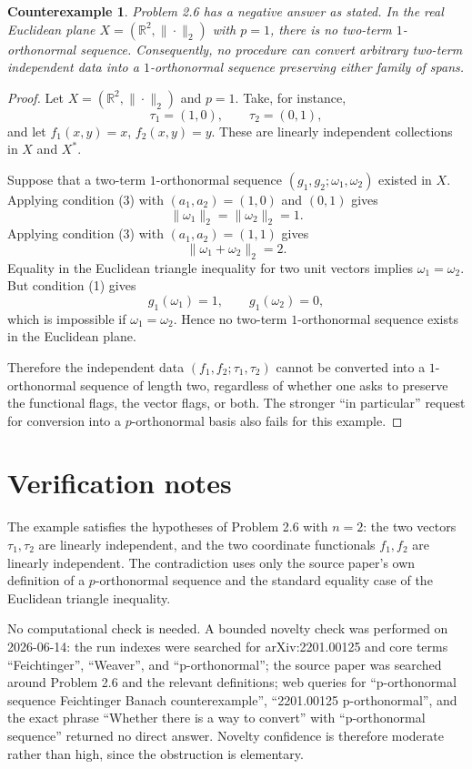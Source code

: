 \documentclass[11pt]{article}
\newtheorem*{theorem}{Counterexample}
\begin{document}
\begin{theorem}
Problem 2.6 has a negative answer as stated.  In the real Euclidean plane
$X=(\mathbb R^2,\|\cdot\|_2)$ with $p=1$, there is no two-term
$1$-orthonormal sequence.  Consequently, no procedure can convert arbitrary
two-term independent data into a $1$-orthonormal sequence preserving either
family of spans.
\end{theorem}

\begin{proof}
Let $X=(\mathbb R^2,\|\cdot\|_2)$ and $p=1$.  Take, for instance,
\[
  \tau_1=(1,0),\qquad \tau_2=(0,1),
\]
and let $f_1(x,y)=x$, $f_2(x,y)=y$.  These are linearly independent
collections in $X$ and $X^*$.

Suppose that a two-term $1$-orthonormal sequence
$(g_1,g_2;\omega_1,\omega_2)$ existed in $X$.  Applying condition (3) with
$(a_1,a_2)=(1,0)$ and $(0,1)$ gives
\[
  \|\omega_1\|_2=\|\omega_2\|_2=1.
\]
Applying condition (3) with $(a_1,a_2)=(1,1)$ gives
\[
  \|\omega_1+\omega_2\|_2=2.
\]
Equality in the Euclidean triangle inequality for two unit vectors implies
$\omega_1=\omega_2$.  But condition (1) gives
\[
  g_1(\omega_1)=1,\qquad g_1(\omega_2)=0,
\]
which is impossible if $\omega_1=\omega_2$.  Hence no two-term
$1$-orthonormal sequence exists in the Euclidean plane.

Therefore the independent data $(f_1,f_2;\tau_1,\tau_2)$ cannot be converted
into a $1$-orthonormal sequence of length two, regardless of whether one asks
to preserve the functional flags, the vector flags, or both.  The stronger
``in particular'' request for conversion into a $p$-orthonormal basis also
fails for this example.
\end{proof}

\section*{Verification notes}

The example satisfies the hypotheses of Problem 2.6 with $n=2$: the two
vectors $\tau_1,\tau_2$ are linearly independent, and the two coordinate
functionals $f_1,f_2$ are linearly independent.  The contradiction uses only
the source paper's own definition of a $p$-orthonormal sequence and the
standard equality case of the Euclidean triangle inequality.

No computational check is needed.  A bounded novelty check was performed on
2026-06-14: the run indexes were searched for arXiv:2201.00125 and core terms
``Feichtinger'', ``Weaver'', and ``p-orthonormal''; the source paper was
searched around Problem 2.6 and the relevant definitions; web queries for
``p-orthonormal sequence Feichtinger Banach counterexample'', ``2201.00125
p-orthonormal'', and the exact phrase ``Whether there is a way to convert''
with ``p-orthonormal sequence'' returned no direct answer.  Novelty confidence
is therefore moderate rather than high, since the obstruction is elementary.
\end{document}

